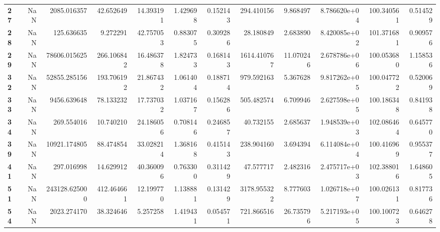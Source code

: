 \begin{table}[h]
\begin{tabular}{lrrrrrrrrrrr}
\textbf{27} &       NaN &    2085.016357 &       42.652649 &                  14.393191 &  1.429698 &  0.152143 &   294.410156 &   9.868497 &  8.786620e+04 &  100.340561 &     0.514529 \\
\textbf{28} &       NaN &     125.636635 &        9.272291 &                  42.757053 &  0.883075 &  0.309286 &    28.180849 &   2.683890 &  8.420085e+02 &  101.371681 &     0.909576 \\
\textbf{29} &       NaN &   78606.015625 &      266.106842 &                  16.486378 &  1.824733 &  0.168143 &  1614.410767 &  11.070246 &  2.678786e+06 &  100.053680 &     1.158536 \\
\textbf{32} &       NaN &   52855.285156 &      193.706192 &                  21.867432 &  1.061404 &  0.188714 &   979.592163 &   5.367628 &  9.817262e+05 &  100.047722 &     0.520069 \\
\textbf{33} &       NaN &    9456.639648 &       78.133232 &                  17.737032 &  1.037167 &  0.156286 &   505.482574 &   6.709946 &  2.627598e+05 &  100.186348 &     0.841938 \\
\textbf{34} &       NaN &     269.554016 &       10.740210 &                  24.186056 &  0.708146 &  0.246857 &    40.732155 &   2.685637 &  1.948539e+03 &  102.086464 &     0.645770 \\
\textbf{39} &       NaN &   10921.174805 &       88.474854 &                  33.028214 &  1.368168 &  0.415143 &   238.904160 &   3.694394 &  6.114084e+04 &  100.416969 &     0.955377 \\
\textbf{41} &       NaN &     297.016998 &       14.629912 &                  40.360096 &  0.763300 &  0.311429 &    47.577717 &   2.482316 &  2.475717e+03 &  102.388016 &     1.648605 \\
\textbf{51} &       NaN &  243128.625000 &      412.464661 &                  12.199770 &  1.138881 &  0.131429 &  3178.955322 &   8.777603 &  1.026718e+07 &  100.026131 &     0.817736 \\
\textbf{54} &       NaN &    2023.274170 &       38.324646 &                   5.257258 &  1.419431 &  0.054571 &   721.866516 &  26.735796 &  5.217193e+05 &  100.100723 &     0.646278 \\
\bottomrule
\end{tabular}
\end{table}
